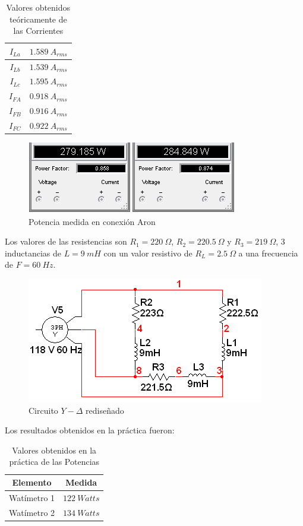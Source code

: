 \documentclass[twocolumn]{IEEEtran}
\begin{document}
\begin{table}[H]
	\centering
\begin{tabular}[c]{|c|c|} \hline
$I_{La}$ & $1.589 \ A_{rms}$ \\ \hline
$I_{Lb}$ & $1.539\ A_{rms}$ \\ \hline
$I_{Lc}$ & $1.595\ A_{rms}$ \\ \hline
$I_{FA}$ & $0.918\ A_{rms}$ \\ \hline
$I_{FB}$ & $0.916\ A_{rms}$ \\ \hline
$I_{FC}$ & $0.922\ A_{rms}$ \\ \hline
\end{tabular}
	\caption{Valores obtenidos teóricamente de las Corrientes}
	\label{tab13}
\end{table}
\begin{figure}[H]
	\centering
		\includegraphics[scale=0.7]{watt2.PNG}
	\caption{Potencia medida en conexión Aron}
	\label{fig12}
\end{figure}
\noindent
Los valores de las resistencias son $R_1 = 220\ \Omega$, $R_2 = 220.5\ \Omega$ y $R_3 = 219\ \Omega$, 3 inductancias de $L = 9\ mH$ con un valor resistivo de $R_L = 2.5\ \Omega$ a una frecuencia de $F = 60\ Hz$.
\begin{figure}[H]
	\centering
		\includegraphics[scale=0.65]{circ2.PNG}
	\caption{Circuito $Y-\Delta$ rediseñado}
	\label{circ13}
\end{figure}
\noindent
Los resultados obtenidos en la práctica fueron:
\begin{table}[H]
	\centering
\begin{tabular}[c]{|c|c|} \hline
Elemento & Medida \\ \hline
Watímetro 1 & $122\ Watts$ \\ \hline
Watímetro 2 & $134\ Watts$ \\ \hline
\end{tabular}
	\caption{Valores obtenidos en la práctica de las Potencias}
	\label{tab4}
\end{table}
\end{document}

